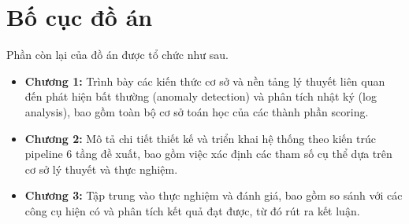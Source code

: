 \documentclass[../main.tex]{subfiles}
\begin{document}
\section*{Bố cục đồ án}

Phần còn lại của đồ án được tổ chức như sau.

\begin{itemize}
    \item \textbf{Chương 1:} Trình bày các kiến thức cơ sở và nền tảng lý thuyết liên quan đến phát hiện bất thường (anomaly detection) và phân tích nhật ký (log analysis), bao gồm toàn bộ cơ sở toán học của các thành phần scoring.
    \item \textbf{Chương 2:} Mô tả chi tiết thiết kế và triển khai hệ thống theo kiến trúc pipeline 6 tầng đề xuất, bao gồm việc xác định các tham số cụ thể dựa trên cơ sở lý thuyết và thực nghiệm.
    \item \textbf{Chương 3:} Tập trung vào thực nghiệm và đánh giá, bao gồm so sánh với các công cụ hiện có và phân tích kết quả đạt được, từ đó rút ra kết luận.
\end{itemize}
\end{document}

